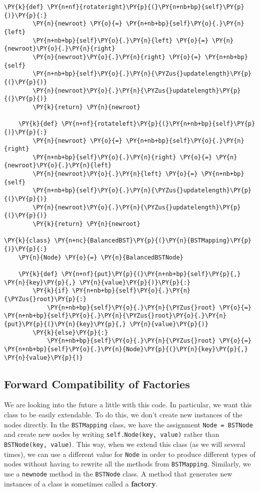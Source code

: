 \begin{Verbatim}[commandchars=\\\{\}]
    \PY{k}{def} \PY{n+nf}{rotateright}\PY{p}{(}\PY{n+nb+bp}{self}\PY{p}{)}\PY{p}{:}
        \PY{n}{newroot} \PY{o}{=} \PY{n+nb+bp}{self}\PY{o}{.}\PY{n}{left}
        \PY{n+nb+bp}{self}\PY{o}{.}\PY{n}{left} \PY{o}{=} \PY{n}{newroot}\PY{o}{.}\PY{n}{right}
        \PY{n}{newroot}\PY{o}{.}\PY{n}{right} \PY{o}{=} \PY{n+nb+bp}{self}
        \PY{n+nb+bp}{self}\PY{o}{.}\PY{n}{\PYZus{}updatelength}\PY{p}{(}\PY{p}{)}
        \PY{n}{newroot}\PY{o}{.}\PY{n}{\PYZus{}updatelength}\PY{p}{(}\PY{p}{)}
        \PY{k}{return} \PY{n}{newroot}

    \PY{k}{def} \PY{n+nf}{rotateleft}\PY{p}{(}\PY{n+nb+bp}{self}\PY{p}{)}\PY{p}{:}
        \PY{n}{newroot} \PY{o}{=} \PY{n+nb+bp}{self}\PY{o}{.}\PY{n}{right}
        \PY{n+nb+bp}{self}\PY{o}{.}\PY{n}{right} \PY{o}{=} \PY{n}{newroot}\PY{o}{.}\PY{n}{left}
        \PY{n}{newroot}\PY{o}{.}\PY{n}{left} \PY{o}{=} \PY{n+nb+bp}{self}
        \PY{n+nb+bp}{self}\PY{o}{.}\PY{n}{\PYZus{}updatelength}\PY{p}{(}\PY{p}{)}
        \PY{n}{newroot}\PY{o}{.}\PY{n}{\PYZus{}updatelength}\PY{p}{(}\PY{p}{)}
        \PY{k}{return} \PY{n}{newroot}

\PY{k}{class} \PY{n+nc}{BalancedBST}\PY{p}{(}\PY{n}{BSTMapping}\PY{p}{)}\PY{p}{:}
    \PY{n}{Node} \PY{o}{=} \PY{n}{BalancedBSTNode}

    \PY{k}{def} \PY{n+nf}{put}\PY{p}{(}\PY{n+nb+bp}{self}\PY{p}{,} \PY{n}{key}\PY{p}{,} \PY{n}{value}\PY{p}{)}\PY{p}{:}
        \PY{k}{if} \PY{n+nb+bp}{self}\PY{o}{.}\PY{n}{\PYZus{}root}\PY{p}{:}
            \PY{n+nb+bp}{self}\PY{o}{.}\PY{n}{\PYZus{}root} \PY{o}{=} \PY{n+nb+bp}{self}\PY{o}{.}\PY{n}{\PYZus{}root}\PY{o}{.}\PY{n}{put}\PY{p}{(}\PY{n}{key}\PY{p}{,} \PY{n}{value}\PY{p}{)}
        \PY{k}{else}\PY{p}{:}
            \PY{n+nb+bp}{self}\PY{o}{.}\PY{n}{\PYZus{}root} \PY{o}{=} \PY{n+nb+bp}{self}\PY{o}{.}\PY{n}{Node}\PY{p}{(}\PY{n}{key}\PY{p}{,} \PY{n}{value}\PY{p}{)}
\end{Verbatim}


\subsection{Forward Compatibility of Factories}


We are looking into the future a little with this code.
In particular, we want this class to be easily extendable.
To do this, we don't create new instances of the nodes directly.
In the \texttt{BSTMapping} class, we have the assignment \texttt{Node = BSTNode} and create new nodes by writing \texttt{self.Node(key, value)} rather than \texttt{BSTNode(key, value)}.
This way, when we extend this class (as we will several times), we can use a different value for \texttt{Node} in order to produce different types of nodes without having to rewrite all the methods from \texttt{BSTMapping}.
Similarly, we use a \texttt{newnode} method in the \texttt{BSTNode} class.
A method that generates new instances of a class is sometimes called a \textbf{factory}.


